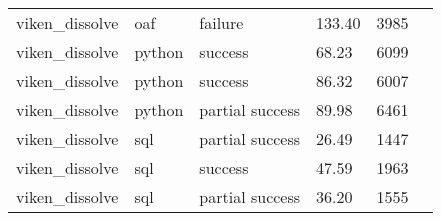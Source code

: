 \begin{longtable}{lp{1.8cm}p{1.8cm}p{1.8cm}p{1.8cm}p{1.8cm}}
viken\_dissolve & oaf & failure & 133.40 & 3985 \\
viken\_dissolve & python & success & 68.23 & 6099 \\
viken\_dissolve & python & success & 86.32 & 6007 \\
viken\_dissolve & python & partial success & 89.98 & 6461 \\
viken\_dissolve & sql & partial success & 26.49 & 1447 \\
viken\_dissolve & sql & success & 47.59 & 1963 \\
viken\_dissolve & sql & partial success & 36.20 & 1555 \\
\end{longtable}
